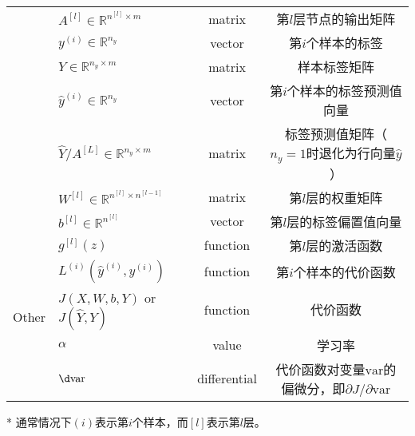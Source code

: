 \begin{table}[htb!]
\begin{threeparttable}
\begin{tabular}{clcc}
                                    & $A^{[l]} \in \mathbb{R}^{n^{[l]} \times {m}}$         & matrix               & 第$l$层节点的输出矩阵                                                         \\
                                    & $y^{(i)} \in \mathbb{R}^{n_y}$                        & vector               & 第$i$个样本的标签                                                         \\
                                    & $Y \in {\mathbb{R}^{n_y \times m}}$                   & matrix               & 样本标签矩阵                                                           \\									
                                    & $\hat{y}^{(i)} \in \mathbb{R}^{n_y}$                  & vector               & 第$i$个样本的标签预测值向量                                                \\
                                    & $\hat{Y} / A^{[L]} \in {\mathbb{R}^{n_y \times m}}$   & matrix               & 标签预测值矩阵（$n_y=1$时退化为行向量$\hat{y}$）   						\\
                                    & $W^{[l]} \in \mathbb{R}^{n^{[l]} \times n^{[l-1]}}$   & matrix               & 第$l$层的权重矩阵                                                               \\
                                    & $b^{[l]} \in \mathbb{R}^{n^{[l]}}$                    & vector               & 第$l$层的标签偏置值向量                                                        \\\hline
        \multirow{5}{*}{Other}      & $g^{[l]}(z)$                                          & function             & 第$l$层的激活函数                                                         \\
                                    & $L^{(i)}(\hat{y}^{(i)}, y^{(i)})$                     & function             & 第$i$个样本的代价函数                                                         \\
                                    & $J(X,W,b,Y)$ or $J(\hat{Y},Y)$                        & function             & 代价函数                                                                        \\
                                    & $\alpha$								                & value                & 学习率                                                                        \\
                                    & $\d \mathrm{var}$                              & differential         & 代价函数对变量$\mathrm{var}$的偏微分，即${\partial J}/{\partial \mathrm{var}}$ \\ \hline
    \end{tabular}
    \label{tab:notations} %
    \begin{tablenotes}
        \item[*] 通常情况下$(i)$表示第$i$个样本，而$[l]$表示第$l$层。
    \end{tablenotes}
    \end{threeparttable}
\end{table}

